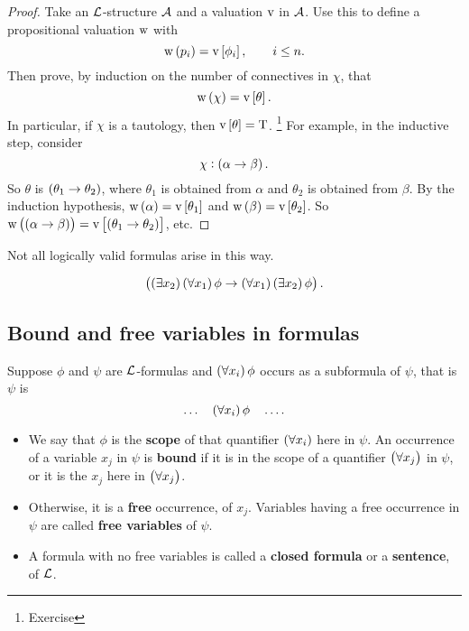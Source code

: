 
\begin{proof}
Take an $ \mathcal{L} $-structure $ \mathcal{A} $ and a valuation $ \mathrm{v} $ in $ \mathcal{A} $. Use this to define a propositional valuation $ \mathrm{w} $ with
$$ \w\br{p_i} = \v\sbr{\phi_i}, \qquad i \le n. $$
Then prove, by induction on the number of connectives in $ \chi $, that
$$ \w\br{\chi} = \v\sbr{\theta}. $$
In particular, if $ \chi $ is a tautology, then $ \v\sbr{\theta} = \T $. \footnote{Exercise} For example, in the inductive step, consider
$$ \chi : \impb{\alpha}{\beta}. $$
So $ \theta $ is $ \impb{\theta_1}{\theta_2} $, where $ \theta_1 $ is obtained from $ \alpha $ and $ \theta_2 $ is obtained from $ \beta $. By the induction hypothesis, $ \w\br{\alpha} = \v\sbr{\theta_1} $ and $ \w\br{\beta} = \v\sbr{\theta_2} $. So $ \w\br{\impb{\alpha}{\beta}} = \v\sbr{\impb{\theta_1}{\theta_2}} $, etc.
\end{proof}

\begin{note*}
Not all logically valid formulas arise in this way.
\end{note*}

\begin{example*}
$$ \impb{\teb{x_2}\fab{x_1}\phi}{\fab{x_1}\teb{x_2}\phi}. $$
\end{example*}

\subsection{Bound and free variables in formulas}

\begin{definition}
Suppose $ \phi $ and $ \psi $ are $ \mathcal{L} $-formulas and $ \fab{x_i}\phi $ occurs as a subformula of $ \psi $, that is $ \psi $ is
$$ \dots \quad \fab{x_i}\phi \quad \dots. $$
\begin{itemize}
\item We say that $ \phi $ is the \textbf{scope} of that quantifier $ \fab{x_i} $ here in $ \psi $. An occurrence of a variable $ x_j $ in $ \psi $ is \textbf{bound} if it is in the scope of a quantifier $ \fab{x_j} $ in $ \psi $, or it is the $ x_j $ here in $ \fab{x_j} $.
\item Otherwise, it is a \textbf{free} occurrence, of $ x_j $. Variables having a free occurrence in $ \psi $ are called \textbf{free variables} of $ \psi $.
\item A formula with no free variables is called a \textbf{closed formula} or a \textbf{sentence}, of $ \mathcal{L} $.
\end{itemize}
\end{definition}

